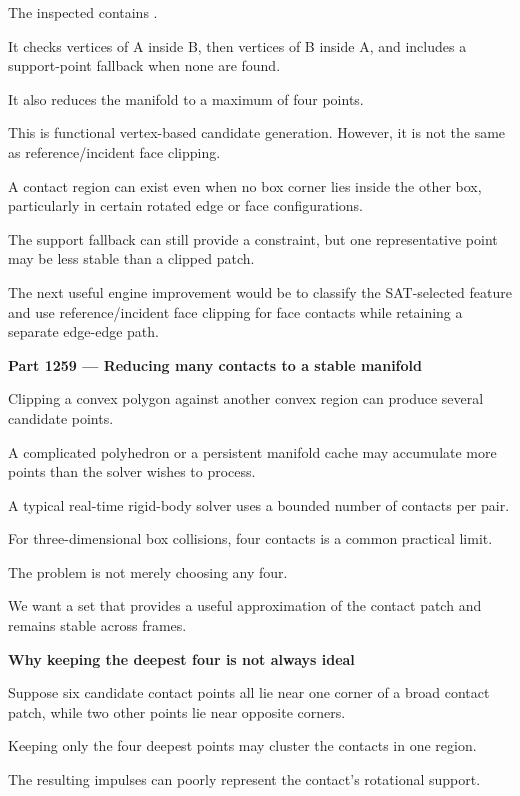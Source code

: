 The inspected  contains .

It checks vertices of A inside B, then vertices of B inside A, and includes a support-point fallback when none are found.

It also reduces the manifold to a maximum of four points.

This is functional vertex-based candidate generation. However, it is not the same as reference/incident face clipping.

A contact region can exist even when no box corner lies inside the other box, particularly in certain rotated edge or face configurations.

The support fallback can still provide a constraint, but one representative point may be less stable than a clipped patch.

The next useful engine improvement would be to classify the SAT-selected feature and use reference/incident face clipping for face contacts while retaining a separate edge-edge path.

\textbf{Part 1259 --- Reducing many contacts to a stable manifold}

Clipping a convex polygon against another convex region can produce several candidate points.

A complicated polyhedron or a persistent manifold cache may accumulate more points than the solver wishes to process.

A typical real-time rigid-body solver uses a bounded number of contacts per pair.

For three-dimensional box collisions, four contacts is a common practical limit.

The problem is not merely choosing any four.

We want a set that provides a useful approximation of the contact patch and remains stable across frames.

\textbf{Why keeping the deepest four is not always ideal}

Suppose six candidate contact points all lie near one corner of a broad contact patch, while two other points lie near opposite corners.

Keeping only the four deepest points may cluster the contacts in one region.

The resulting impulses can poorly represent the contact's rotational support.


